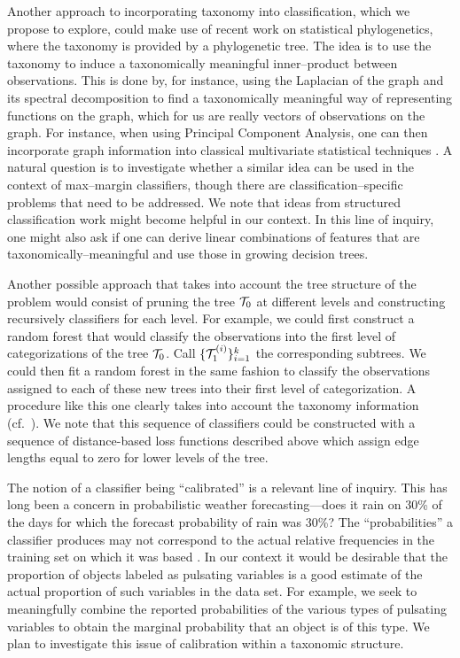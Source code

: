 Another approach to incorporating taxonomy into classification, which we propose
to explore, could make use of recent work on statistical phylogenetics, where
the taxonomy is provided by a phylogenetic tree.  The idea \citep{elithesis} is
to use the taxonomy to induce a taxonomically meaningful inner--product between
observations. This is done by, for instance, using the Laplacian of the graph
and its spectral decomposition to find a taxonomically meaningful way of
representing functions on the graph, which for us are really vectors of
observations on the graph. For instance, when using Principal Component
Analysis, one can then incorporate graph information into classical multivariate
statistical techniques \cite{PurdomAnalyzingDataWithGraphs08}. A natural
question is to investigate whether a similar idea can be used in the context of
max--margin classifiers, though there are classification--specific problems that
need to be addressed. We note that ideas from structured classification work
\citep{bcmt-lmmsc-04} might become helpful in our context. In this line of
inquiry, one might also ask if one can derive linear combinations of features
that are taxonomically--meaningful and use those in growing decision trees.

Another possible approach that takes  into account the tree structure of the
problem would consist of pruning the tree ${\cal T}_0$ at different levels and
constructing recursively classifiers for each level.  For example, we could
first construct a random forest that would classify the observations into the
first level of categorizations of the tree ${\cal T}_0$. Call $\{{\cal
T}_1^{(i)}\}_{i=1}^k$ the corresponding subtrees. We could then fit a random
forest in the same fashion to classify the observations assigned to each of
these new trees into their first level of categorization. A procedure like this
one clearly takes into account the taxonomy information (cf.\
\citealt{CesaBianchi06}).  We note that this sequence of classifiers could be
constructed with a sequence of distance-based loss functions described above
which assign edge lengths equal to zero for lower levels of the tree.

The notion of a classifier being ``calibrated'' is a relevant line of inquiry.
This has long been a concern in probabilistic weather forecasting---does it rain
on 30\% of the days for which the forecast probability of rain was 30\%?  The
``probabilities'' a classifier produces may not correspond to the actual
relative frequencies in the training set on which it was based
\citep{niculescu05:obtaining}.  In our context it would be desirable that the
proportion of objects labeled as pulsating variables is a good estimate of the
actual proportion of such variables in the data set.  For example, we seek  to
meaningfully combine  the reported probabilities of the various types of
pulsating variables to obtain the marginal probability that an object is of this
type.  We plan to investigate this issue of calibration within a taxonomic
structure.


